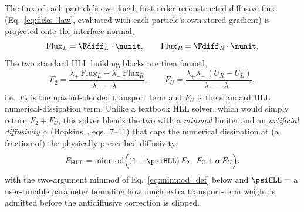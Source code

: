 The flux of each particle's own local, first-order-reconstructed
diffusive flux (Eq.~\eqref{eq:ficks_law}, evaluated with each particle's
own stored gradient) is projected onto the interface normal,
\begin{equation}
  \mathrm{Flux}_{L} = \Fdiff_L\cdot\nunit , \qquad \mathrm{Flux}_R = \Fdiff_R\cdot\nunit .
\end{equation}
The two standard HLL building blocks are then formed,
\begin{equation}
  F_2 = \frac{\lambda_+\,\mathrm{Flux}_L - \lambda_-\,\mathrm{Flux}_R}{\lambda_+-\lambda_-} ,
  \qquad
  F_U = \frac{\lambda_+\lambda_- \,(U_R-U_L)}{\lambda_+-\lambda_-} ,
\end{equation}
i.e.\ $F_2$ is the upwind-blended transport term and $F_U$ is the
standard HLL numerical-dissipation term. Unlike a textbook HLL solver,
which would simply return $F_2 + F_U$, this solver blends the two with a
\emph{minmod} limiter and an \emph{artificial diffusivity} $\alpha$
(Hopkins~\citeyear{Hopkins2017diffusion}, eqs.~7--11) that caps the numerical dissipation at (a
fraction of) the physically prescribed diffusivity:
\begin{equation}
  \label{eq:flux_hll}
  F_{\rm HLL} = \mathrm{minmod}\Big((1+\psiHLL)\, F_2,\ F_2 + \alpha\, F_U\Big) ,
\end{equation}
with the two-argument minmod of Eq.~\eqref{eq:minmod_def} below and
$\psiHLL = $  a user-tunable
parameter bounding how much extra transport-term weight is admitted
before the antidiffusive correction is clipped.

